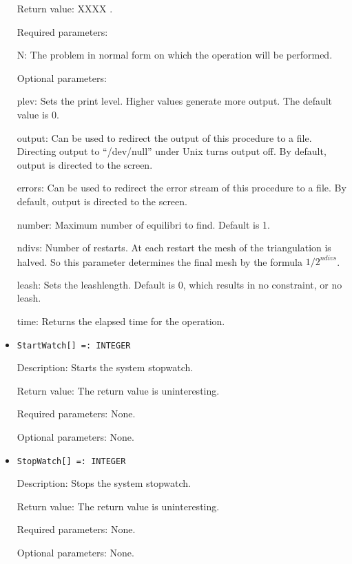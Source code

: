 \begin{itemize}
\item
[Return value:] XXXX .
\item
[Required parameters:]\hfil\null

\bd
\item
[N:] The problem in normal form on which the operation will be
performed.
\ed

\item
[Optional parameters:]\hfil\null
	
\bd
\item
[plev:] Sets the print level.  Higher values generate more output.
The default value is 0.
\item
[output:] Can be used to redirect the output of this procedure to a
file.  Directing output to ``/dev/null'' under Unix turns output off.
By default, output is directed to the screen.
\item
[errors:] Can be used to redirect the error stream of this procedure
to a file.  By default, output is directed to the screen.
\item
[number:] Maximum number of equilibri to find. Default is 1.  
\item 
[ndivs:] Number of restarts.  At each restart the mesh of the
triangulation is halved.  So this parameter determines the final mesh
by the formula ${1/2}^{ndivs}$.
\item
[leash:] Sets the leashlength. Default is 0, which results in no
constraint, or no leash.  
\item
[time:] Returns the elapsed time for the operation.
\ed
\ed

\item

\protect \large \begin{verbatim}
StartWatch[] =: INTEGER
\end{verbatim}\normalsize

\bd
\item
[Description:] Starts the system stopwatch.
\item
[Return value:] The return value is uninteresting.
\item
[Required parameters:] None.
\item
[Optional parameters:] None.
\ed

\item
\protect \large \begin{verbatim}
StopWatch[] =: INTEGER
\end{verbatim}\normalsize

\bd
\item
[Description:] Stops the system stopwatch.
\item
[Return value:] The return value is uninteresting.
\item
[Required parameters:] None.
\item
[Optional parameters:] None.
\ed


\end{itemize}
